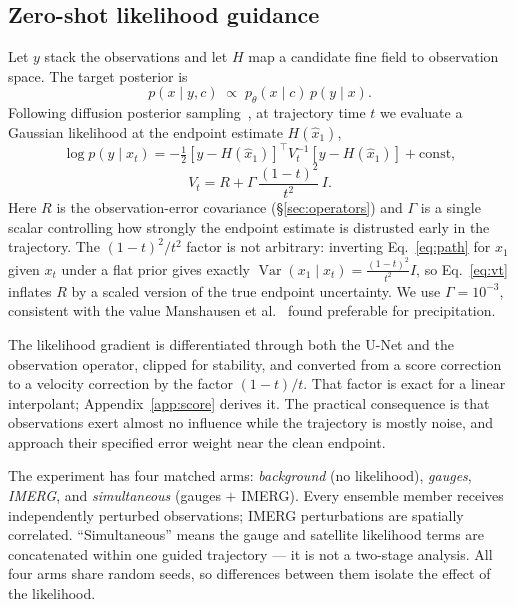 \documentclass[10pt,twocolumn]{article}
\begin{document}
\subsection{Zero-shot likelihood guidance}
\label{sec:guidance}

Let $y$ stack the observations and let $H$ map a candidate fine field to
observation space. The target posterior is
\begin{equation}
 p(x\mid y,c)\;\propto\;p_\theta(x\mid c)\,p(y\mid x).
 \label{eq:posterior}
\end{equation}
Following diffusion posterior sampling~\cite{chung2023}, at trajectory time
$t$ we evaluate a Gaussian likelihood at the endpoint estimate
$H(\widehat{x}_1)$,
\begin{equation}
 \log p(y\mid x_t) = -\tfrac{1}{2}
 \left[y-H(\widehat{x}_1)\right]^{\!\top}\! V_t^{-1}
 \left[y-H(\widehat{x}_1)\right]+\mathrm{const},
 \label{eq:likelihood}
\end{equation}
\begin{equation}
 V_t=R+\Gamma\,\frac{(1-t)^2}{t^2}\,I .
 \label{eq:vt}
\end{equation}
Here $R$ is the observation-error covariance (\S\ref{sec:operators}) and
$\Gamma$ is a single scalar controlling how strongly the endpoint estimate is
distrusted early in the trajectory. The $(1-t)^2/t^2$ factor is not
arbitrary: inverting Eq.~\eqref{eq:path} for $x_1$ given $x_t$ under a flat
prior gives exactly $\operatorname{Var}(x_1\mid x_t)=\frac{(1-t)^2}{t^2}I$, so
Eq.~\eqref{eq:vt} inflates $R$ by a scaled version of the true endpoint
uncertainty. We use $\Gamma=10^{-3}$, consistent with the value
Manshausen et al.~\cite{manshausen2025} found preferable for precipitation.

The likelihood gradient is differentiated through both the U-Net and the
observation operator, clipped for stability, and converted from a score
correction to a velocity correction by the factor $(1-t)/t$. That factor is
exact for a linear interpolant; Appendix~\ref{app:score} derives it. The
practical consequence is that observations exert almost no influence while the
trajectory is mostly noise, and approach their specified error weight near the
clean endpoint.

The experiment has four matched arms: \emph{background} (no likelihood),
\emph{gauges}, \emph{IMERG}, and \emph{simultaneous} (gauges $+$ IMERG). Every
ensemble member receives independently perturbed observations; IMERG
perturbations are spatially correlated. ``Simultaneous'' means the gauge and
satellite likelihood terms are concatenated within one guided trajectory --- it
is not a two-stage analysis. All four arms share random seeds, so differences
between them isolate the effect of the likelihood.
\end{document}
